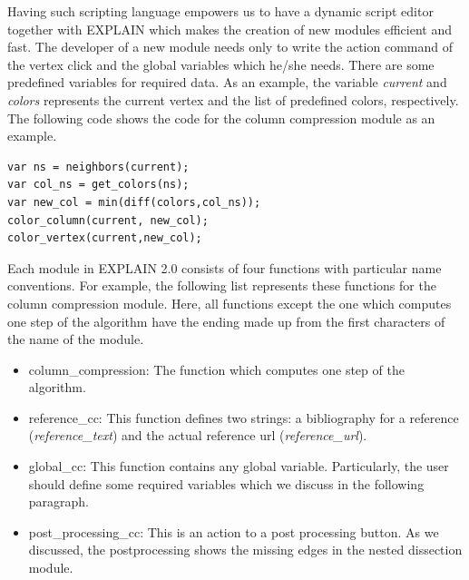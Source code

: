 \documentclass[12pt, twoside,a4paper,toc=bibliography]{scrbook}
\begin{document}
Having such scripting language empowers us to have a dynamic script editor
together with EXPLAIN which makes the creation of new modules efficient and fast.
The developer of a new module needs only to write the action command of the vertex
click and the global variables which he/she needs.
There are some predefined variables for required data.
As an example, the variable \textit{current} and \textit{colors}
represents the current vertex and the list of predefined colors, respectively.
The following code shows the code for the column compression
module as an example.
\begin{lstlisting}
var ns = neighbors(current);
var col_ns = get_colors(ns);
var new_col = min(diff(colors,col_ns));
color_column(current, new_col);
color_vertex(current,new_col);
\end{lstlisting}
Each module in EXPLAIN 2.0 consists of four functions with particular
name conventions. For example, the following list represents these functions
for the column compression module.
Here, all functions except the one which computes one step of the algorithm
have the ending made up from the first characters of the name of the module.
\begin{itemize}
\item column\_compression: The function which computes one step of the algorithm.
\item reference\_cc: This function defines two strings: a bibliography for a reference (\textit{reference\_text}) and the actual reference url (\textit{reference\_url}).
\item global\_cc: This function contains any global variable. Particularly, the user should define some required variables which we discuss in the following paragraph.
\item post\_processing\_cc: This is an action to a post processing button. As we discussed, the postprocessing shows the missing edges in the nested dissection module.
\end{itemize}
\end{document}
